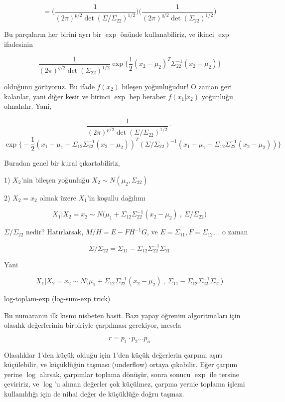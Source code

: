 \documentclass[12pt,fleqn]{article}\usepackage{../../common}
\begin{document}
$$ =
\bigg( \frac{ 1}{(2\pi)^{p/2} \det(\Sigma/\Sigma_{22})^{1/2}} \bigg)
\bigg( \frac{ 1}{(2\pi)^{q/2} \det(\Sigma_{22})^{1/2}} \bigg)
 $$

Bu parçaların her birini ayrı bir $\exp$ önünde kullanabiliriz, ve ikinci $\exp$
ifadesinin 

$$ 
\frac{ 1}{(2\pi)^{q/2} \det(\Sigma_{22})^{1/2}}
\exp \bigg\{
\frac{ 1}{2}(x_2-\mu_2)^T\Sigma_{22}^{-1} (x_2-\mu_2)
 \bigg\}
 $$


olduğunu görüyoruz. Bu ifade $f(x_2)$ bileşen yoğunluğudur! O zaman geri
kalanlar, yani diğer kesir ve birinci $\exp$ hep beraber $f(x_1|x_2)$
yoğunluğu olmalıdır. Yani,

$$ 
\frac{ 1}{(2\pi)^{p/2} \det(\Sigma/\Sigma_{22})^{1/2}} \cdot
 $$
$$ 
\exp \bigg\{
-\frac{1 }{2} 
(x_1 - \mu_1 - \Sigma_{12}\Sigma_{22}^{-1} (x_2 - \mu_2))^T 
(\Sigma/\Sigma_{22})^{-1} 
(x_1 - \mu_1 - \Sigma_{12}\Sigma_{22}^{-1} (x_2 - \mu_2))
\bigg\}
 $$

Buradan genel bir kural çıkartabiliriz, 

1) $X_2$'nin bileşen yoğunluğu $X_2 \sim N(\mu_2, \Sigma_{22})$

2) $X_2 = x_2$ olmak üzere $X_1$'in koşullu dağılımı 

$$ X_1 | X_2 = x_2 \sim 
N\bigg(\mu_1 + \Sigma_{12}\Sigma_{22}^{-1} (x_2 -\mu_2) \ , \
\Sigma/\Sigma_{22} \bigg)
 $$

$\Sigma/\Sigma_{22}$ nedir? Hatırlarsak, $M/H = E-FH^{-1}G$, ve 
$E = \Sigma_{11},F=\Sigma_{12},..$ o zaman 

$$ \Sigma/\Sigma_{22} = \Sigma_{11}-\Sigma_{12} \Sigma_{22}^{-1} \Sigma_{21} $$

Yani

$$ X_1 | X_2 = x_2 \sim 
N\bigg(\mu_1 + \Sigma_{12}\Sigma_{22}^{-1} (x_2 -\mu_2) \ , \
\Sigma_{11}-\Sigma_{12} \Sigma_{22}^{-1} \Sigma_{21}
\bigg)
 $$ 






log-toplam-exp (log-sum-exp trick)

Bu numaranın ilk kısmı nisbeten basit. Bazı yapay öğrenim algoritmaları için
olasılık değerlerinin birbiriyle çarpılması gerekiyor, mesela 

$$ r = p_1 \cdot p_2 \dots p_n $$

Olasılıklar 1'den küçük olduğu için 1'den küçük değerlerin çarpımı aşırı
küçülebilir, ve küçüklüğün taşması (underflow) ortaya çıkabilir. Eğer
çarpım yerine $\log$ alırsak, çarpımlar toplama dönüşür, sonra sonucu
$\exp$ ile tersine çeviririz, ve $\log$'u alınan değerler çok küçülmez,
çarpma yernie toplama işlemi kullanıldığı için de nihai değer de küçüklüğe
doğru taşmaz.
\end{document}
